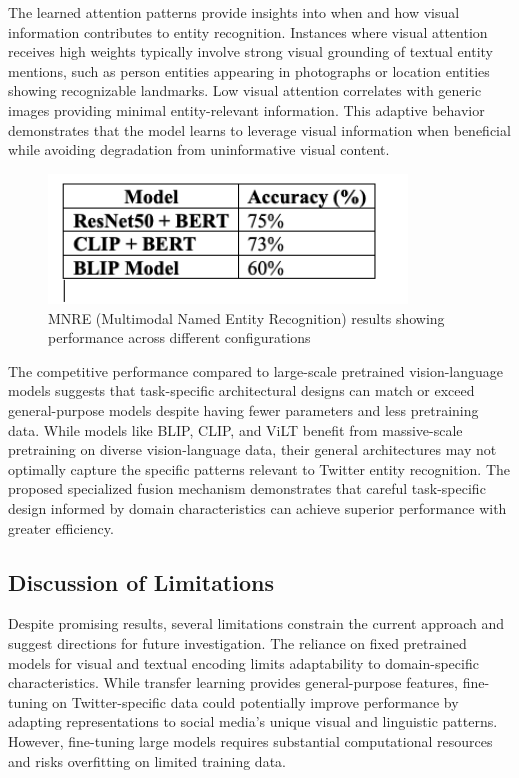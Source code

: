\documentclass[12pt,a4paper]{report}
\begin{document}
The learned attention patterns provide insights into when and how visual information contributes to entity recognition. Instances where visual attention receives high weights typically involve strong visual grounding of textual entity mentions, such as person entities appearing in photographs or location entities showing recognizable landmarks. Low visual attention correlates with generic images providing minimal entity-relevant information. This adaptive behavior demonstrates that the model learns to leverage visual information when beneficial while avoiding degradation from uninformative visual content.

\begin{figure}[H]
\centering
\includegraphics[width=0.85\textwidth]{mnre_results.png}
\caption{MNRE (Multimodal Named Entity Recognition) results showing performance across different configurations}
\label{fig:mnre_results}
\end{figure}

The competitive performance compared to large-scale pretrained vision-language models suggests that task-specific architectural designs can match or exceed general-purpose models despite having fewer parameters and less pretraining data. While models like BLIP, CLIP, and ViLT benefit from massive-scale pretraining on diverse vision-language data, their general architectures may not optimally capture the specific patterns relevant to Twitter entity recognition. The proposed specialized fusion mechanism demonstrates that careful task-specific design informed by domain characteristics can achieve superior performance with greater efficiency.

\subsection{Discussion of Limitations}

Despite promising results, several limitations constrain the current approach and suggest directions for future investigation. The reliance on fixed pretrained models for visual and textual encoding limits adaptability to domain-specific characteristics. While transfer learning provides general-purpose features, fine-tuning on Twitter-specific data could potentially improve performance by adapting representations to social media's unique visual and linguistic patterns. However, fine-tuning large models requires substantial computational resources and risks overfitting on limited training data.
\end{document}
